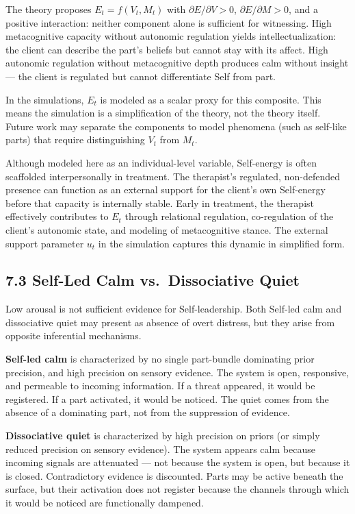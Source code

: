 \documentclass[11pt]{article}
\begin{document}
The theory proposes \(E_t = f(V_t, M_t)\) with
\(\partial E / \partial V > 0\), \(\partial E / \partial M > 0\), and a
positive interaction: neither component alone is sufficient for
witnessing. High metacognitive capacity without autonomic regulation
yields intellectualization: the client can describe the part's beliefs
but cannot stay with its affect. High autonomic regulation without
metacognitive depth produces calm without insight --- the client is
regulated but cannot differentiate Self from part.

In the simulations, \(E_t\) is modeled as a scalar proxy for this
composite. This means the simulation is a simplification of the theory,
not the theory itself. Future work may separate the components to model
phenomena (such as self-like parts) that require distinguishing \(V_t\)
from \(M_t\).

Although modeled here as an individual-level variable, Self-energy is
often scaffolded interpersonally in treatment. The therapist's
regulated, non-defended presence can function as an external support for
the client's own Self-energy before that capacity is internally stable.
Early in treatment, the therapist effectively contributes to \(E_t\)
through relational regulation, co-regulation of the client's autonomic
state, and modeling of metacognitive stance. The external support
parameter \(u_t\) in the simulation captures this dynamic in simplified
form.

\subsection{7.3 Self-Led Calm vs.~Dissociative
Quiet}\label{self-led-calm-vs.-dissociative-quiet}

Low arousal is not sufficient evidence for Self-leadership. Both
Self-led calm and dissociative quiet may present as absence of overt
distress, but they arise from opposite inferential mechanisms.

\textbf{Self-led calm} is characterized by no single part-bundle
dominating prior precision, and high precision on sensory evidence. The
system is open, responsive, and permeable to incoming information. If a
threat appeared, it would be registered. If a part activated, it would
be noticed. The quiet comes from the absence of a dominating part, not
from the suppression of evidence.

\textbf{Dissociative quiet} is characterized by high precision on priors
(or simply reduced precision on sensory evidence). The system appears
calm because incoming signals are attenuated --- not because the system
is open, but because it is closed. Contradictory evidence is discounted.
Parts may be active beneath the surface, but their activation does not
register because the channels through which it would be noticed are
functionally dampened.
\end{document}
